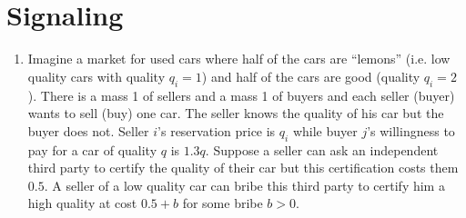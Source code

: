 \documentclass[a4paper,12pt]{article}
\begin{document}
\section{Signaling}
\label{sec:signaling}

\begin{enumerate}[resume]
\item Imagine a market for used cars where half of the cars are ``lemons'' (i.e. low quality cars with quality $q_i=1$) and half of the cars are good (quality $q_i=2$). There is a mass 1 of sellers and a mass 1 of buyers and each seller (buyer) wants to sell (buy) one car. The seller knows the quality of his car but the buyer does not. Seller $i$'s reservation price is $q_i$ while buyer $j$'s willingness to pay for a car of quality $q$ is $1.3q$. Suppose a seller can ask an independent third party to certify the quality of their car but this certification costs them $0.5$. A seller of a low quality car can bribe this third party to certify him a high quality at cost $0.5+b$ for some bribe $b>0$.


\end{enumerate}
\end{document}
